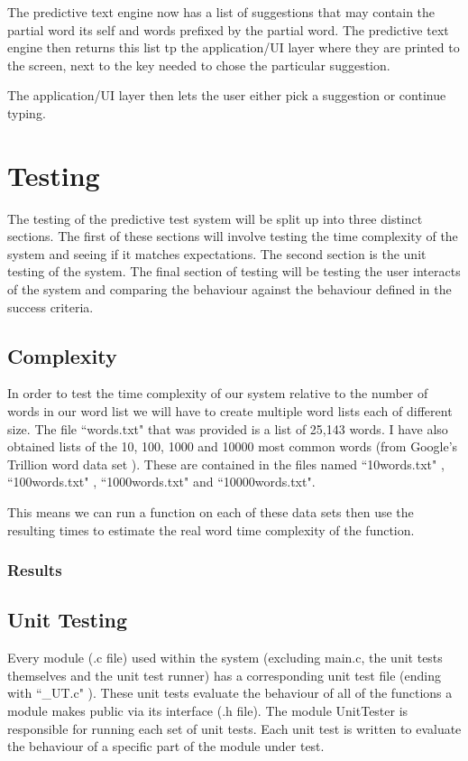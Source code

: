 \documentclass[10pt]{article} %
\begin{document}
            The predictive text engine now has a list of suggestions that may contain the partial word its self and words prefixed by the partial word. The predictive text engine then returns this list tp the application/UI layer where they are printed to the screen, next to the key needed to chose the particular suggestion.
            
            The application/UI layer then lets the user either pick a suggestion or continue typing.
            
    
	\section{Testing}
	
	    The testing of the predictive test system will be split up into three distinct sections. The first of these sections will involve testing the time complexity of the system and seeing if it matches expectations. The second section is the unit testing of the system. The final section of testing will be testing the user interacts of the system and comparing the behaviour against the behaviour defined in the success criteria.
		\subsection{Complexity}
		    In order to test the time complexity of our system relative to the number of words in our word list we will have to create multiple word lists each of different size. The file ``words.txt" that was provided is a list of 25,143 words. I have also obtained lists of the 10, 100, 1000 and 10000 most common words (from Google's Trillion word data set \cite{github:wordlist:first20hours} ). These are contained in the files named ``10words.txt" , ``100words.txt" , ``1000words.txt" and ``10000words.txt".
		    
		    This means we can run a function on each of these data sets then use the resulting times to estimate the real word time complexity of the function.
		    
			\subsubsection{Results}
				

				
		\subsection{Unit Testing}
		    Every module (.c file) used within the system (excluding main.c, the unit tests themselves and the unit test runner) has a corresponding unit test file (ending with ``\_UT.c" ). These unit tests evaluate the behaviour of all of the functions a module makes public via its interface (.h file). The module UnitTester is responsible for running each set of unit tests. Each unit test is written to evaluate the behaviour of a specific part of the module under test.
		    
\end{document}
